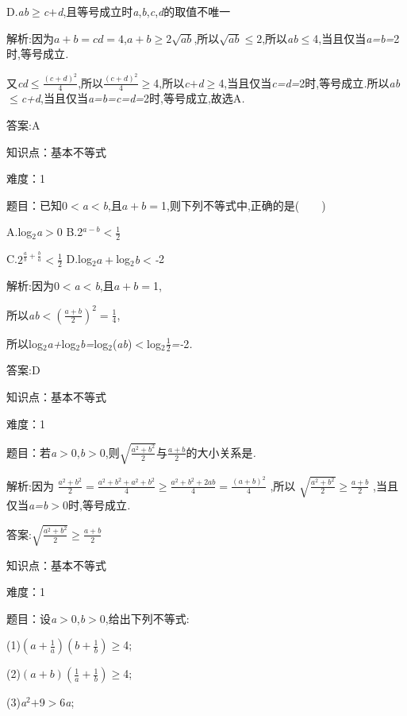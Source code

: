 \documentclass{article} %
\begin{document}
 D.\textit{ab}$\mathrm{\ge}$\textit{c$+$d},且等号成立时\textit{a},\textit{b},\textit{c},\textit{d}的取值不唯一

 解析:因为$a+b=cd=4$,$a+b\ge 2\sqrt{ab}$,所以$\sqrt{ab}\le 2$,所以\textit{ab}$\mathrm{\le}$4,当且仅当\textit{a=b=}2时,等号成立\textit{.}

又\textit{cd}$\mathrm{\le}\frac{{(c+d)}^2}{4}$,所以$\frac{{(c+d)}^2}{4}$$\mathrm{\ge}$4,所以\textit{c$+$d}$\mathrm{\ge}$4,当且仅当\textit{c=d=}2时,等号成立\textit{.}所以\textit{ab}$\mathrm{\le}$\textit{c+d},当且仅当\textit{a=b=c=d=}2时,等号成立,故选A\textit{.}

 答案:A

知识点：基本不等式

难度：1

 题目：已知0\textit{$<$a$<$b},且\textit{$a+b=$}1,则下列不等式中,正确的是(\textit{　　})

 A.log${}_{2}$\textit{a$>$}0 B.2\textit{${}^{a-b}$$<\frac{1}{2}$}

 C.$2^{\frac{a}{b}+\frac{b}{a}}<\frac{1}{2}$ D.log${}_{2}$\textit{$a+$}log${}_{2}$\textit{b$<$-}2

 解析:因为0\textit{$<$a$<$b},且\textit{$a+b=$}1,

所以\textit{ab$<{(\frac{a+b}{2})}^2=\frac{1}{4}$},

所以log${}_{2}$\textit{a+}log${}_{2}$\textit{b=}log${}_{2}$(\textit{ab})\textit{$<$}log${}_{2}\frac{1}{2}$\textit{=-}2\textit{.}

 答案:D

知识点：基本不等式

难度：1

 题目：若\textit{a$>$}0,\textit{b$>$}0,则$\sqrt{\frac{a^2+b^2}{2}}$与$\frac{a+b}{2}$的大小关系是\textit{\underbar{　　　　　}.~}

 解析:因为
$\frac{a^2+b^2}{2}=\frac{a^2+b^2+a^2+b^2}{4}\ge \frac{a^2+b^2+2ab}{4}=\frac{{(a+b)}^2}{4}$
,所以
$\sqrt{\frac{a^2+b^2}{2}}\ge \frac{a+b}{2}$
,当且仅当\textit{a=b$>$}0时,等号成立\textit{.}

 答案:$\sqrt{\frac{a^2+b^2}{2}}\ge \frac{a+b}{2}$

知识点：基本不等式

难度：1

 
题目：设\textit{a$>$}0,\textit{b$>$}0,给出下列不等式:

 (1)$(a+\frac{1}{a})(b+\frac{1}{b})$$\mathrm{\ge}$4;

 (2)$(a+b)(\frac{1}{a}+\frac{1}{b})\mathrm{\ge}$4;

 (3)\textit{a}${}^{2}$\textit{$+$}9\textit{$>$}6\textit{a};
\end{document}

